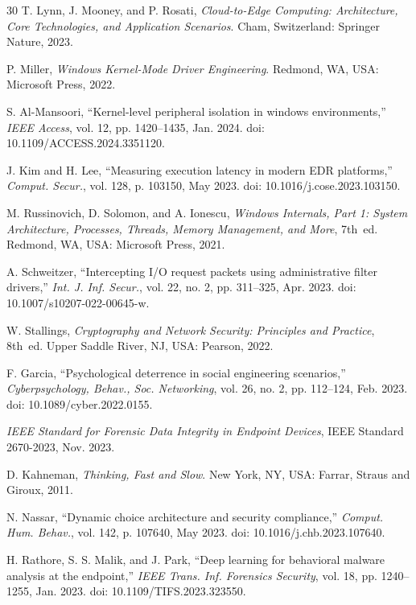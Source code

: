 \documentclass{ieeeaccess}
\begin{document}
\begin{thebibliography}{30}
T. Lynn, J. Mooney, and P. Rosati, {\em Cloud-to-Edge Computing: Architecture, Core Technologies, and Application Scenarios}. Cham, Switzerland: Springer Nature, 2023.

P. Miller, {\em Windows Kernel-Mode Driver Engineering}. Redmond, WA, USA: Microsoft Press, 2022.

S. Al-Mansoori, ``Kernel-level peripheral isolation in windows environments,'' {\em IEEE Access}, vol. 12, pp. 1420--1435, Jan. 2024. doi: 10.1109/ACCESS.2024.3351120.

J. Kim and H. Lee, ``Measuring execution latency in modern EDR platforms,'' {\em Comput. Secur.}, vol. 128, p. 103150, May 2023. doi: 10.1016/j.cose.2023.103150.

M. Russinovich, D. Solomon, and A. Ionescu, {\em Windows Internals, Part 1: System Architecture, Processes, Threads, Memory Management, and More}, 7th~ed. Redmond, WA, USA: Microsoft Press, 2021.

A. Schweitzer, ``Intercepting I/O request packets using administrative filter drivers,'' {\em Int. J. Inf. Secur.}, vol. 22, no. 2, pp. 311--325, Apr. 2023. doi: 10.1007/s10207-022-00645-w.

W. Stallings, {\em Cryptography and Network Security: Principles and Practice}, 8th~ed. Upper Saddle River, NJ, USA: Pearson, 2022.

F. Garcia, ``Psychological deterrence in social engineering scenarios,'' {\em Cyberpsychology, Behav., Soc. Networking}, vol. 26, no. 2, pp. 112--124, Feb. 2023. doi: 10.1089/cyber.2022.0155.

{\em IEEE Standard for Forensic Data Integrity in Endpoint Devices}, IEEE Standard 2670-2023, Nov. 2023.

D. Kahneman, {\em Thinking, Fast and Slow}. New York, NY, USA: Farrar, Straus and Giroux, 2011.

N. Nassar, ``Dynamic choice architecture and security compliance,'' {\em Comput. Hum. Behav.}, vol. 142, p. 107640, May 2023. doi: 10.1016/j.chb.2023.107640.

H. Rathore, S. S. Malik, and J. Park, ``Deep learning for behavioral malware analysis at the endpoint,'' {\em IEEE Trans. Inf. Forensics Security}, vol. 18, pp. 1240--1255, Jan. 2023. doi: 10.1109/TIFS.2023.323550.


\end{thebibliography}
\end{document}
